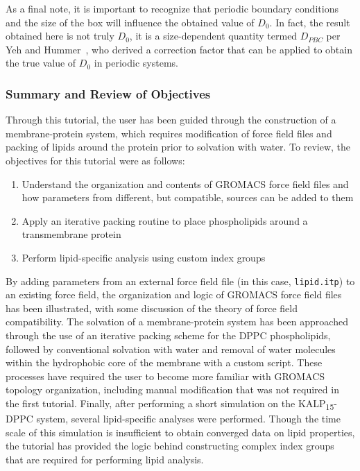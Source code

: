 \documentclass[9pt,tutorial,pubversion]{livecoms}
\begin{document}
As a final note, it is important to recognize that periodic boundary conditions and the size of the box will influence the obtained value of $D_0$. In fact, the result obtained here is not truly $D_0$, it is a size-dependent quantity termed $D_{PBC}$ per Yeh and Hummer~\cite{Yeh2004}, who derived a correction factor that can be applied to obtain the true value of $D_0$ in periodic systems.

\subsubsection{Summary and Review of Objectives} \label{kalp_summary}

Through this tutorial, the user has been guided through the construction of a membrane-protein system, which requires modification of force field files and packing of lipids around the protein prior to solvation with water. To review, the objectives for this tutorial were as follows:

\begin{enumerate}
	\item Understand the organization and contents of GROMACS force field files and how parameters from different, but compatible, sources can be added to them
	\item Apply an iterative packing routine to place phospholipids around a transmembrane protein
	\item Perform lipid-specific analysis using custom index groups
\end{enumerate}

By adding parameters from an external force field file (in this case, \texttt{lipid.itp}) to an existing force field, the organization and logic of GROMACS force field files has been illustrated, with some discussion of the theory of force field compatibility. The solvation of a membrane-protein system has been approached through the use of an iterative packing scheme for the DPPC phospholipids, followed by conventional solvation with water and removal of water molecules within the hydrophobic core of the membrane with a custom script. These processes have required the user to become more familiar with GROMACS topology organization, including manual modification that was not required in the first tutorial. Finally, after performing a short simulation on the KALP\textsubscript{15}-DPPC system, several lipid-specific analyses were performed. Though the time scale of this simulation is insufficient to obtain converged data on lipid properties, the tutorial has provided the logic behind constructing complex index groups that are required for performing lipid analysis.
\end{document}
